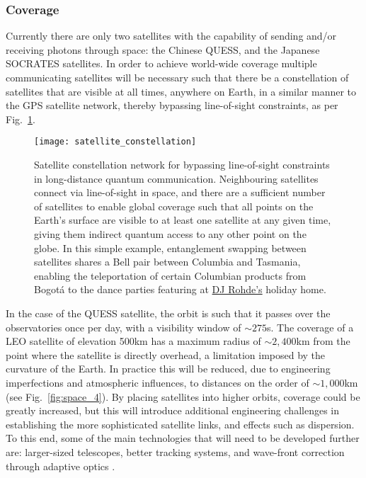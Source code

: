 %
%

\subsubsection{Coverage}

Currently there are only two satellites with the capability of sending and/or receiving photons through space: the Chinese QUESS, and the Japanese SOCRATES satellites. In order to achieve world-wide coverage multiple communicating satellites will be necessary such that there be a constellation of satellites that are visible at all times, anywhere on Earth, in a similar manner to the GPS satellite network, thereby bypassing line-of-sight constraints, as per Fig.~\ref{fig:sat_constellation}.

\begin{figure}[!htb]
	\texttt{[image: satellite\_constellation]}
	\caption{Satellite constellation network for bypassing line-of-sight constraints in long-distance quantum communication. Neighbouring satellites connect via line-of-sight in space, and there are a sufficient number of satellites to enable global coverage such that all points on the Earth's surface are visible to at least one satellite at any given time, giving them indirect quantum access to any other point on the globe. In this simple example, entanglement swapping between satellites shares a Bell pair between Columbia and Tasmania, enabling the teleportation of certain Columbian products from Bogot{\'a} to the dance parties featuring at \href{https://soundcloud.com/peter-rohde}{DJ Rohde's} holiday home.} \label{fig:sat_constellation}
\end{figure}

In the case of the QUESS satellite, the orbit is such that it passes over the observatories once per day, with a visibility window of $\sim 275$s. The coverage of a LEO satellite of elevation 500km has a maximum radius of $\sim 2,400$km from the point where the satellite is directly overhead, a limitation imposed by the curvature of the Earth. In practice this will be reduced, due to engineering imperfections and atmospheric influences, to distances on the order of $\sim 1,000$km (see Fig.~\ref{fig:space_4}). By placing satellites into higher orbits, coverage could be greatly increased, but this will introduce additional engineering challenges in establishing the more sophisticated satellite links, and effects such as dispersion. To this end, some of the main technologies that will need to be developed further are: larger-sized telescopes, better tracking systems, and wave-front correction through adaptive optics \cite{bib:liao2017satellite}.

